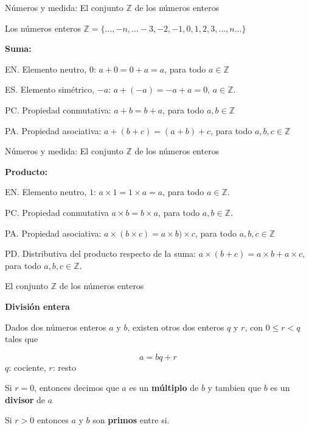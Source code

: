 \documentclass[ignorenonframetext,]{beamer}
\begin{document}
\begin{frame}{Números y medida: El conjunto \(\mathbb{Z}\) de los
números enteros}
\protect\hypertarget{nuxfameros-y-medida-el-conjunto-mathbbz-de-los-nuxfameros-enteros}{}

Los números enteros
\(\mathbb{Z} = \{ \ldots ,-n, \ldots -3,-2,-1,0,1,2,3, \ldots , n \ldots\}\)

\textbf{Suma:}

EN. Elemento neutro, \(0\): \(a+0=0+a=a\), para todo
\(a \in \mathbb{Z}\)

ES. Elemento simétrico, \(-a\): \(a +(-a) = -a+a = 0\),
\(a \in \mathbb{Z}\).

PC. Propiedad conmutativa: \(a+b =b+a\), para todo
\(a,b \in \mathbb{Z}\)

PA. Propiedad asociativa: \(a+(b+c) = (a+b)+c\), para todo
\(a,b,c \in \mathbb{Z}\)

\end{frame}

\begin{frame}{Números y medida: El conjunto \(\mathbb{Z}\) de los
números enteros}
\protect\hypertarget{nuxfameros-y-medida-el-conjunto-mathbbz-de-los-nuxfameros-enteros-1}{}

\textbf{Producto:}

EN. Elemento neutro, \(1\): \(a \times 1 = 1 \times a =a\), para todo
\(a \in \mathbb{Z}\).

PC. Propiedad conmutativa \(a \times b = b \times a\), para todo
\(a,b \in \mathbb{Z}\).

PA. Propiedad asociativa:
\(a\times (b \times c) = a \times b)\times c\), para todo
\(a,b,c \in \mathbb{Z}\)

PD. Distributiva del producto respecto de la suma:
\(a \times (b+c) = a\times b +a \times c\), para todo
\(a,b,c \in \mathbb{Z}\).

\end{frame}

\begin{frame}{El conjunto \(\mathbb{Z}\) de los números enteros}
\protect\hypertarget{el-conjunto-mathbbz-de-los-nuxfameros-enteros}{}

\textbf{División entera}

Dados dos números enteros \(a\) y \(b\), existen otros dos enteros \(q\)
y \(r\), con \(0 \leq r<q\) tales que

\[
a=bq+r
\] \(q\): cociente, \(r\): resto

Si \(r=0\), entonces decimos que \(a\) es un \textbf{múltiplo} de \(b\)
y tambien que \(b\) es un \textbf{divisor} de \(a\)

Si \(r>0\) entonces \(a\) y \(b\) son \textbf{primos} entre si.

\end{frame}
\end{document}
